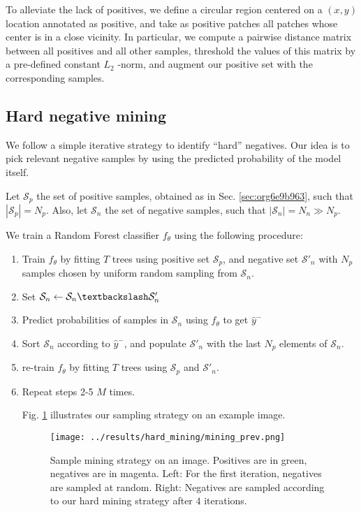 \documentclass[11pt]{article}
\begin{document}
To alleviate the lack of positives, we define a circular region centered on a \((x,y)\) location
annotated as positive, and
take as positive patches all patches whose center is in a close vicinity.
In particular, we compute a pairwise distance matrix between all positives and all other samples,
threshold the values of this matrix by a pre-defined constant \(L_2\) -norm,
and augment our positive set with the corresponding samples.

\subsection{Hard negative mining}
\label{sec:orgd115d86}

We follow a simple iterative strategy to identify ``hard'' negatives.
Our idea is to pick relevant negative samples by using the predicted probability of the model itself.

Let \(\mathcal{S}_p\) the set of positive samples, obtained as in Sec. \ref{sec:org6e9b963}, such that \(|\mathcal{S}_p|=N_p\).
Also, let \(\mathcal{S}_n\) the set of negative samples, such that \(|\mathcal{S}_n|=N_n \gg N_p\).


We train a Random Forest classifier \(f_\theta\) using the following procedure:

\begin{enumerate}
\item Train \(f_\theta\) by fitting \(T\) trees using positive set \(\mathcal{S}_p\), and negative set \(\mathcal{S}'_n\) with \(N_p\)
samples chosen by uniform random sampling from \(\mathcal{S}_n\).
\item Set \(\mathcal{S}_n \leftarrow \mathcal{S}_n \textbackslash \mathcal{S}'_n\)
\item Predict probabilities of samples in \(\mathcal{S}_n\) using \(f_\theta\) to get \(\hat{y}^-\)
\item Sort \(\mathcal{S}_n\) according to \(\hat{y}^-\), and populate
\(\mathcal{S}'_n\) with the last \(N_p\) elements of \(\mathcal{S}_n\).
\item re-train \(f_\theta\) by fitting \(T\) trees using \(\mathcal{S}_p\) and \(\mathcal{S}'_n\).
\item Repeat steps 2-5 \(M\) times.

Fig. \ref{fig:org9c16bf9} illustrates our sampling strategy on an example image.

\begin{figure}[htbp]
\centering
\texttt{[image: ../results/hard\_mining/mining\_prev.png]}
\caption{\label{fig:org9c16bf9}Sample mining strategy on an image. Positives are in green, negatives are in magenta. Left: For the first iteration, negatives are sampled at random. Right: Negatives are sampled according to our hard mining strategy after \(4\) iterations.}
\end{figure}
\end{enumerate}
\end{document}
